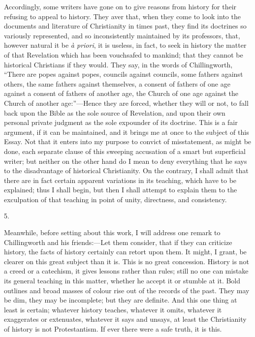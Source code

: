 Accordingly, some writers have gone on to give reasons
from history for their refusing to appeal to history.
They aver that, when they come to look into the documents
and literature of Christianity in times past, they find
its doctrines so variously represented, and so
inconsistently maintained by its professors, that,
however natural it be \emph{à priori},
it is useless, in fact, to seek in history the matter of
that Revelation which has been vouchsafed to mankind;
that they cannot be historical Christians if they would.
They say, in the words of Chillingworth, ``There are
popes against popes, councils against councils, some
fathers against others, the same fathers against
themselves, a consent of fathers of one age against a
consent of fathers of another age, the Church of one age
against the Church of another age:''—Hence they
are forced, whether they will or not, to fall back upon
the Bible as the sole source of Revelation, and upon
their own personal private judgment as the sole expounder
of its doctrine. This is a fair argument, if it can be
maintained, and it brings me at once to the subject of
this Essay. Not that it enters into my purpose to convict
of misstatement, as might be done, each separate clause
of this sweeping accusation of a smart but superficial
writer; but neither on the other hand do I mean to deny
everything that he says to the disadvantage of historical
Christianity. On the contrary, I shall admit that there
are in fact certain apparent variations in its teaching,
which have to be explained; thus I shall begin, but then
I shall attempt to explain them to the exculpation of
that teaching in point of unity, directness, and
consistency.

5.

Meanwhile, before setting about this work, I will
address one remark to Chillingworth and his
friends:—Let them consider, that if they can
criticize history, the facts of history certainly can
retort upon them. It might, I grant, be clearer on this
great subject than it is. This is no great concession.
History is not a creed or a catechism, it gives lessons
rather than rules; still no one can mistake its general
teaching in this matter, whether he accept it or stumble
at it. Bold outlines and broad masses of colour rise out
of the records of the past. They may be dim, they may be
incomplete; but they are definite. And this one thing at
least is certain; whatever history teaches, whatever it
omits, whatever it exaggerates or extenuates, whatever it
says and unsays, at least the Christianity of history is
not Protestantism. If ever there were a safe truth, it is
this.

